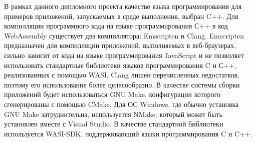 В рамках данного дипломного проекта качестве языка программирования для примеров приложений, запускаемых в среде выполнения, выбран C++.
Для компилляции программного кода на языке программирования С++ в код WebAssembly существует два компиллятора: Emscripten и Clang. 
Emscripten предназначен для компилляции приложений, выполняемых в веб-браузерах, сильно зависит от кода на языке программирования JavaScript и не позволяет использовать стандартные библиотеки языков программирования C и С++, реализованных с помощью WASI.
Clang лишен перечисленных недостатков, поэтому его использование более целесообразно.
В качестве системы сборки приложений будет использоваться GNU Make, конфигурации которого сгенерированы с помощью CMake.
Для ОС Windows, где обычно установка GNU Make затруднительна, используется NMake, который может быть установлен вместе с Visual Studio.
В качестве стандартной библиотеки используется WASI-SDK, поддерживающий языки программирования C и C++.